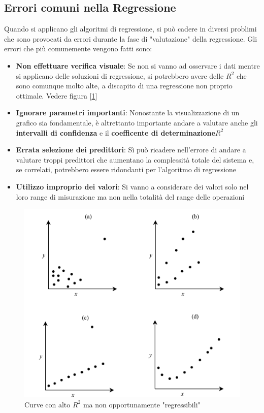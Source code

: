 \subsection{Errori comuni nella Regressione}
Quando si applicano gli algoritmi di regressione, si può cadere in diversi problimi che sono provocati da errori durante la fase di "valutazione" della regressione. Gli errori che più comunemente vengono fatti sono:
\begin{itemize}
\item \textbf{Non effettuare verifica visuale}: Se non si vanno ad osservare i dati mentre si applicano delle soluzioni di regressione, si potrebbero avere delle \(R^2\) che sono comunque molto alte, a discapito di una regressione non proprio ottimale. Vedere figura [\ref{img:no-visualize}]

\item \textbf{Ignorare parametri importanti}: Nonostante la visualizzazione di un grafico sia fondamentale, è altrettanto importante andare a valutare anche gli \textbf{intervalli di confidenza} e il \textbf{coefficente di determinazione}\(R^2\)

\item \textbf{Errata selezione dei predittori}: Sì può ricadere nell'errore di andare a valutare troppi predittori che aumentano la complessità totale del sistema e, se correlati, potrebbero essere ridondanti per l'algoritmo di regressione

\item \textbf{Utilizzo improprio dei valori}: Si vanno a considerare dei valori solo nel loro range di misurazione ma non nella totalità del range delle operazioni
\end{itemize}

\begin{figure}[h]
\centering
\includegraphics[width=.7\textwidth]{img/chapter-5/no-visualize.png}
\caption{Curve con alto \(R^2\) ma non opportunamente "regressibili"}\label{img:no-visualize}
\end{figure}

